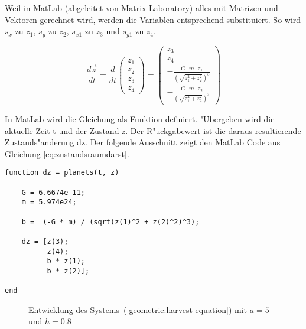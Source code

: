 \begin{refsection}
Weil in MatLab (abgeleitet von Matrix Laboratory) alles mit Matrizen und Vektoren gerechnet wird, werden die Variablen entsprechend substituiert. So wird $s_x$ zu $z_1$, $s_y$ zu $z_2$, $s_{x1}$ zu $z_3$ und $s_{y1}$ zu $z_4$.

\begin{equation}\label{eq:zustandsraumdarst}
\frac{d \vec{z}}{dt}=\frac{d}{dt} \begin{pmatrix}
z_1 \\ 
z_2 \\
z_3 \\
z_4
\end{pmatrix} = \begin{pmatrix}
z_3 \\ 
z_4 \\
-\frac{G \cdot m \cdot z_1}{(\sqrt{z_1^2 + z_2^2})^3} \\
-\frac{G \cdot m \cdot z_2}{(\sqrt{z_1^2 + z_2^2})^3}
\end{pmatrix}
\end{equation}

In MatLab wird die Gleichung als Funktion definiert.
"Ubergeben wird die aktuelle Zeit t und der Zustand z.
Der R"uckgabewert ist die daraus resultierende  Zustands"anderung dz.
Der folgende Ausschnitt zeigt den MatLab Code aus Gleichung \ref{eq:zustandsraumdarst}.

\begin{lstlisting}[style=Matlab]
function dz = planets(t, z)

    G = 6.6674e-11;
    m = 5.974e24;

    b =  (-G * m) / (sqrt(z(1)^2 + z(2)^2)^3);
    
    dz = [z(3);
          z(4);
          b * z(1);
          b * z(2)];
      
end
\end{lstlisting}

\begin{figure}
\centering
\caption{Entwicklung des Systems~(\ref{geometrie:harvest-equation})
mit $a=5$ und $h=0.8$
\label{geometrie:harvest-graph}}
\end{figure}%

\end{refsection}

